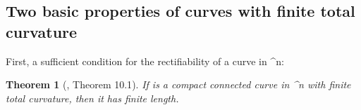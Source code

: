 \documentclass[a4paper, 11pt]{article}
\theoremstyle{plain}
\newtheorem{theorem}{Theorem}[section]
\theoremstyle{definition}
\theoremstyle{remark}
\numberwithin{equation}{subsection}
\def\({}
\def\){}
\def\pi{}
\begin{document}



\subsection{Two basic properties of curves with finite total curvature}

First, a sufficient condition for the rectifiability of a curve in \(^{n}\):

\begin{theorem}[{\cite{EWW02}, Theorem 10.1}]
\label{Basic_Property_1}
If \(\Gamma\) is a compact connected curve in \(^{n}\) with finite total curvature, then it has finite length.
\end{theorem}

\begin{comment}  
\begin{proof}
Let \(\gamma\) be a parametrisation of \(\Gamma\). We may assume that this is closed (if not, we close it up with a straight line segment). If \(\mathbf{u}\) is a unit vector, then the total variation of \(t \mapsto \gamma(t) \cdot \mathbf{u}\) is at most the diameter of \(\Gamma\) times the number of local extrema of \(\gamma(t) \cdot \mathbf{u}\). Averaging both sides of this inequality over all unit vectors \(\mathbf{u}\) gives
\begin{equation}
c_{n}\operatorname{Length}(\Gamma) \leqslant \operatorname{diam}(\Gamma) \cdot \operatorname{TotalCurvature}(\Gamma),
\end{equation}
where the constant \(c_{n} > 0\) depends only on the dimension \(n\).
\end{proof}
\end{comment}
\end{document}
